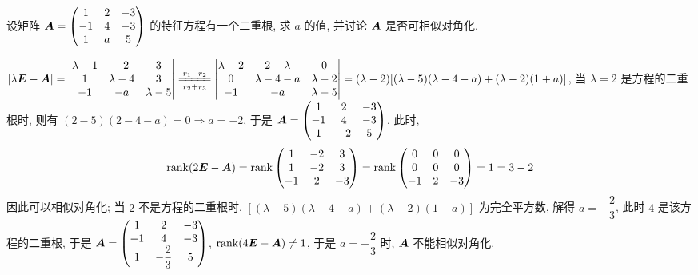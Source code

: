 \begin{example}[2004 数一]
    设矩阵 $\vb*{A}=\mqty(1&2&-3\\-1&4&-3\\1&a&5)$ 的特征方程有一个二重根, 求 $a$ 的值, 并讨论 $\vb*{A}$ 是否可相似对角化.
\end{example}
\begin{solution}
    $|\lambda\vb*{E}-\vb*{A}|=\mqty|\lambda-1&-2&3\\1&\lambda-4&3\\-1&-a&\lambda-5|\xlongequal[r_2+r_3]{r_1-r_2}\mqty|\lambda-2&2-\lambda&0\\0&\lambda-4-a&\lambda-2\\-1&-a&\lambda-5|=(\lambda-2)\qty[(\lambda-5)(\lambda-4-a)+(\lambda-2)(1+a)]$,
    当 $\lambda=2$ 是方程的二重根时, 则有 $(2-5)(2-4-a)=0\Rightarrow a=-2$, 于是 $\vb*{A}=\mqty(1&2&-3\\-1&4&-3\\1&-2&5)$, 此时,
    $$\rank(2\vb*{E}-\vb*{A})=\rank\mqty(1&-2&3\\1&-2&3\\-1&2&-3)=\rank\mqty(0&0&0\\0&0&0\\-1&2&-3)=1=3-2$$
    因此可以相似对角化; 当 $2$ 不是方程的二重根时, $[(\lambda-5)(\lambda-4-a)+(\lambda-2)(1+a)]$ 为完全平方数, 解得 $a=-\dfrac{2}{3}$, 此时 $4$ 是该方程的二重根,
    于是 $\vb*{A}=\mqty(1&2&-3\\-1&4&-3\\1&-\dfrac{2}{3}&5)$, $\rank(4\vb*{E}-\vb*{A})\neq 1$, 于是 $a=-\dfrac{2}{3}$ 时, $\vb*{A}$ 不能相似对角化.
\end{solution}
